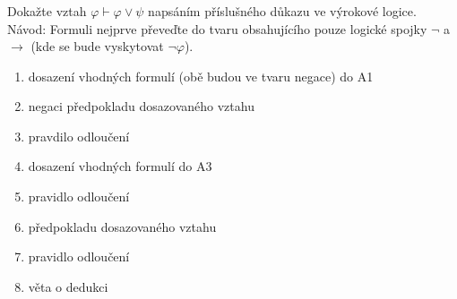 \subsubsection{}
Dokažte vztah $\varphi \vdash \varphi \vee \psi$ napsáním příslušného důkazu ve
výrokové logice. Návod: Formuli nejprve převeďte do tvaru obsahujícího pouze
logické spojky $\neg$ a $\rightarrow$ (kde se bude vyskytovat $\neg \varphi$).
\begin{enumerate}[1)]
  \item dosazení vhodných formulí (obě budou ve tvaru negace) do A1
  \item negaci předpokladu dosazovaného vztahu
  \item pravdilo odloučení
  \item dosazení vhodných formulí do A3
  \item pravidlo odloučení
  \item předpokladu dosazovaného vztahu
  \item pravidlo odloučení
  \item věta o dedukci
\end{enumerate}
